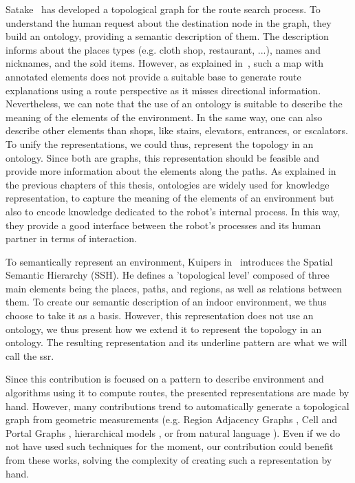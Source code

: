 Satake~\cite{satake_2015_field} has developed a topological graph for the route search process. To understand the human request about the destination node in the graph, they build an ontology, providing a semantic description of them. The description informs about the places types (e.g. cloth shop, restaurant, ...), names and nicknames, and the sold items. However, as explained in~\cite{morales_2015_building}, such a map with annotated elements does not provide a suitable base to generate route explanations using a route perspective as it misses directional information. Nevertheless, we can note that the use of an ontology is suitable to describe the meaning of the elements of the environment. In the same way, one can also describe other elements than shops, like stairs, elevators, entrances, or escalators. To unify the representations, we could thus, represent the topology in an ontology. Since both are graphs, this representation should be feasible and provide more information about the elements along the paths. As explained in the previous chapters of this thesis, ontologies are widely used for knowledge representation, to capture the meaning of the elements of an environment but also to encode knowledge dedicated to the robot's internal process. In this way, they provide a good interface between the robot's processes and its human partner in terms of interaction.%

To semantically represent an environment, Kuipers in~\cite{kuipers_2000_spatial} introduces the Spatial Semantic Hierarchy (SSH). He defines a 'topological level' composed of three main elements being the places, paths, and regions, as well as relations between them. To create our semantic description of an indoor environment, we thus choose to take it as a basis. However, this representation does not use an ontology, we thus present how we extend it to represent the topology in an ontology. The resulting representation and its underline pattern are what we will call the \acrfull{ssr}.

Since this contribution is focused on a pattern to describe environment and algorithms using it to compute routes, the presented representations are made by hand. However, many contributions trend to automatically generate a topological graph from geometric measurements (e.g. Region Adjacency Graphs \cite{kuipers_2004_local}, Cell and Portal Graphs \cite{lefebvre_2003_automatic}, hierarchical models \cite{lorenz_2006_hybrid}, or from natural language \cite{hemachandra_2014_learning}). Even if we do not have used such techniques for the moment, our contribution could benefit from these works, solving the complexity of creating such a representation by hand.

